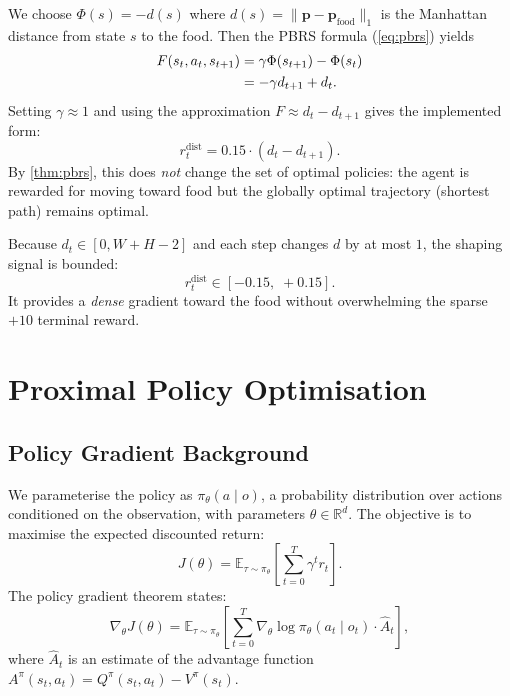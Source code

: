 \documentclass[11pt,a4paper]{article}
\newcommand{\R}{\mathbb{R}}
\newcommand{\E}{\mathbb{E}}
\newcommand{\policy}{\pi}
\begin{document}
We choose $\Phi(s) = -d(s)$ where $d(s) = \|\mathbf{p} - \mathbf{p}_{\text{food}}\|_1$
is the Manhattan distance from state $s$ to the food.
Then the PBRS formula (\ref{eq:pbrs}) yields
\begin{align}
  F(s_t, a_t, s_{t+1})
    &= \gamma \Phi(s_{t+1}) - \Phi(s_t) \notag \\
    &= -\gamma d_{t+1} + d_t.
\end{align}
Setting $\gamma \approx 1$ and using the approximation $F \approx d_t - d_{t+1}$
gives the implemented form:
\begin{equation}
  r_t^{\text{dist}} = 0.15 \cdot (d_t - d_{t+1}).
  \label{eq:dist_shaping}
\end{equation}
By \cref{thm:pbrs}, this does \emph{not} change the set of optimal policies:
the agent is rewarded for moving toward food but the globally optimal trajectory
(shortest path) remains optimal.

\begin{keyresult}
Because $d_t \in [0, W{+}H{-}2]$ and each step changes $d$ by at most $1$,
the shaping signal is bounded:
\[
  r_t^{\text{dist}} \in [-0.15,\; +0.15].
\]
It provides a \emph{dense} gradient toward the food without
overwhelming the sparse $+10$ terminal reward.
\end{keyresult}

\section{Proximal Policy Optimisation}

\subsection{Policy Gradient Background}

We parameterise the policy as $\policy_\theta(a \mid o)$,
a probability distribution over actions conditioned on the observation,
with parameters $\theta \in \R^d$.
The objective is to maximise the expected discounted return:
\begin{equation}
  J(\theta) = \E_{\tau \sim \policy_\theta}\left[\sum_{t=0}^{T} \gamma^t r_t\right].
\end{equation}
The policy gradient theorem states:
\begin{equation}
  \nabla_\theta J(\theta)
  = \E_{\tau \sim \policy_\theta}\left[
      \sum_{t=0}^{T} \nabla_\theta \log \policy_\theta(a_t \mid o_t) \cdot \hat{A}_t
    \right],
  \label{eq:pg}
\end{equation}
where $\hat{A}_t$ is an estimate of the advantage function
$A^\policy(s_t, a_t) = Q^\policy(s_t, a_t) - V^\policy(s_t)$.
\end{document}
